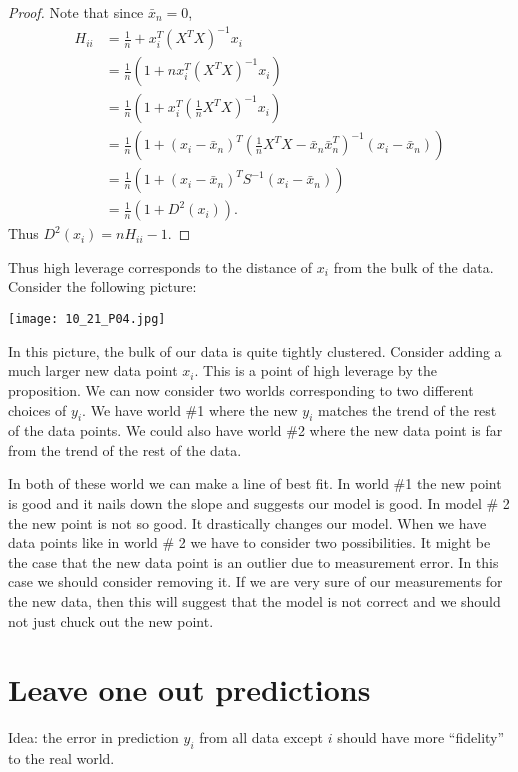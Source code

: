 \begin{proof}
    Note that since $\bar{x}_n = 0$,
    \begin{align*}
        H_{ii}&=\frac{1}{n}+x_i^T(X^TX)^{-1}x_i\\
        &=\frac{1}{n}\left(1 + nx_i^T(X^TX)^{-1}x_i\right)\\
        &=\frac{1}{n}\left(1 + x_i^T(\frac{1}{n}X^TX)^{-1}x_i\right)\\
        &=\frac{1}{n}\left(1 + (x_i-\bar{x}_n)^T\left(\frac{1}{n}X^TX-\bar{x}_n\bar{x}_n^T\right)^{-1}(x_i-\bar{x}_n)\right)\\
        &=\frac{1}{n}\left(1 + (x_i-\bar{x}_n)^TS^{-1}(x_i-\bar{x}_n)\right)\\
        &=\frac{1}{n}(1+D^2(x_i)).
    \end{align*}
    Thus $D^2(x_i) = nH_{ii}-1$.
\end{proof}
Thus high leverage corresponds to the distance of $x_i$ from the bulk of the data. Consider the following picture:

\begin{center}
    \texttt{[image: 10\_21\_P04.jpg]}
\end{center}

In this picture, the bulk of our data is quite tightly clustered. Consider adding a much larger new data point $x_i$. This is a point of high leverage by the proposition. We can now consider two worlds corresponding to two different choices of $y_i$. We have world \#1 where the new $y_i$ matches the trend of the rest of the data points. We could also have world \#2 where the new data point is far from the trend of the rest of the data.

In both of these world we can make a line of best fit. In world \#1  the new point is good and it nails down the slope and suggests our model is good. In model \# 2 the new point is not so good. It drastically changes our model. When we have data points like in world \# 2 we have to consider two possibilities. It might be the case that the new data point is an outlier due to measurement error. In this case we should consider removing it. If we are very sure of our measurements for the new data, then this will suggest that the model is not correct and we should not just chuck out the new point.

\section{Leave one out predictions}
Idea: the error in prediction $y_i$ from all data except $i$ should have more ``fidelity'' to the real world.

